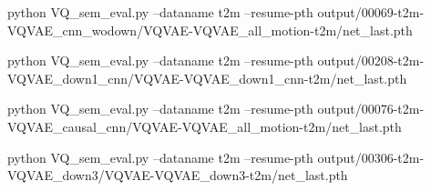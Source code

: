 python VQ_sem_eval.py --dataname t2m --resume-pth output/00069-t2m-VQVAE_cnn_wodown/VQVAE-VQVAE_all_motion-t2m/net_last.pth

python VQ_sem_eval.py --dataname t2m --resume-pth output/00208-t2m-VQVAE_down1_cnn/VQVAE-VQVAE_down1_cnn-t2m/net_last.pth

python VQ_sem_eval.py --dataname t2m --resume-pth output/00076-t2m-VQVAE_causal_cnn/VQVAE-VQVAE_all_motion-t2m/net_last.pth

python VQ_sem_eval.py --dataname t2m --resume-pth output/00306-t2m-VQVAE_down3/VQVAE-VQVAE_down3-t2m/net_last.pth


